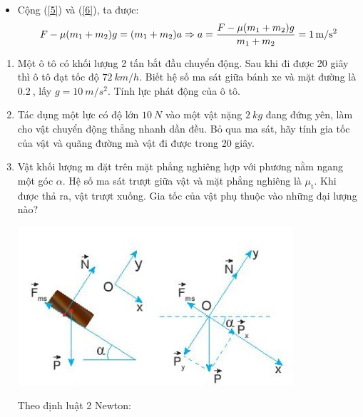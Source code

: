 {\begin{itemize}
		Biến đổi (\ref{4}), ta được:
		\begin{equation}\label{6}
			T - \mu m_2 g= m_2 a
		\end{equation}
		
		\item Cộng (\ref{5}) và (\ref{6}), ta được:
		\begin{equation*}
			F - \mu (m_1 + m_2) g = (m_1 + m_2) a \\
			\Rightarrow a = \dfrac{F - \mu (m_1 + m_2)g}{m_1 + m_2} = \SI{1}{m/s^2}
		\end{equation*}
	\end{itemize}
}
\begin{enumerate}[label=\bfseries Câu \arabic*:]
		\item {}
	
	{
		Một ô tô có khối lượng 2 tấn bắt đầu chuyển động. Sau khi đi được 20 giây thì ô tô đạt tốc độ $\SI{72}{km/h}$. Biết hệ số ma sát giữa bánh xe và mặt đường là $\SI{0.2}{}$, lấy $g=\SI{10}{m/s^2}$. Tính lực phát động của ô tô.
	}
	
	
	\item {}
	
	{
		Tác dụng một lực có độ lớn $\SI{10}{N}$ vào một vật nặng $\SI{2}{kg}$ đang đứng yên, làm cho vật chuyển động thẳng nhanh dần đều. Bỏ qua ma sát, hãy tính gia tốc của vật và quãng đường mà vật đi được trong 20 giây.
	}
	
	\item {}
	
	
	{
		Vật khối lượng m đặt trên mặt phẳng nghiêng hợp với phương nằm ngang một góc $\alpha$. Hệ số ma sát trượt giữa vật và mặt phẳng nghiêng là $\mu_\text{t}$. Khi được thả ra, vật trượt xuống. Gia tốc của vật phụ thuộc vào những đại lượng nào?
		
	}
	
	\hideall
	{
			\begin{center}
				\includegraphics[scale=1]{../figs/VN10-2022-PH-TP021-3.jpg}
			\end{center}
		Theo định luật 2 Newton:
		
}
\end{enumerate}
